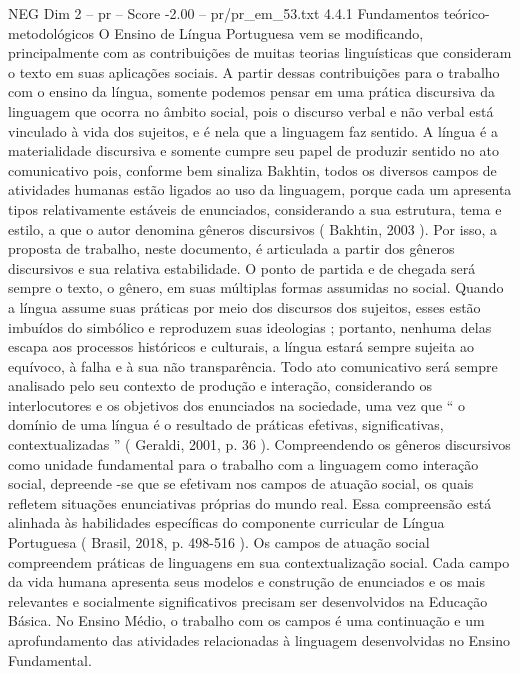 \begin{textsample}{NEG Dim 2 – pr – Score -2.00 – pr/pr\_em\_53.txt}  \label{ex:f2_neg_175}
4.4.1 Fundamentos teórico-metodológicos O Ensino de Língua Portuguesa vem se modificando, principalmente com as contribuições de muitas teorias linguísticas que consideram o texto em suas aplicações sociais.
A partir dessas contribuições para o trabalho com o ensino da língua, somente podemos pensar em uma prática discursiva da linguagem que ocorra no âmbito social, pois o discurso verbal e não verbal está vinculado à vida dos sujeitos, e é nela que a linguagem faz sentido.
A língua é a materialidade discursiva e somente cumpre seu papel de produzir sentido no ato comunicativo pois, conforme bem sinaliza Bakhtin, todos os diversos campos de atividades humanas estão ligados ao uso da linguagem, porque cada um apresenta tipos relativamente estáveis de enunciados, considerando a sua estrutura, tema e estilo, a que o autor denomina gêneros discursivos ( Bakhtin, 2003 ).
Por isso, a proposta de trabalho, neste documento, é articulada a partir dos gêneros discursivos e sua relativa estabilidade.
O ponto de partida e de chegada será sempre o texto, o gênero, em suas múltiplas formas assumidas no social.
Quando a língua assume suas práticas por meio dos discursos dos sujeitos, esses estão imbuídos do simbólico e reproduzem suas ideologias ; portanto, nenhuma delas escapa aos processos históricos e culturais, a língua estará sempre sujeita ao equívoco, à falha e à sua não transparência.
Todo ato comunicativo será sempre analisado pelo seu contexto de produção e interação, considerando os interlocutores e os objetivos dos enunciados na sociedade, uma vez que “ o domínio de uma língua é o resultado de práticas efetivas, significativas, contextualizadas ” ( Geraldi, 2001, p. 36 ).
Compreendendo os gêneros discursivos como unidade fundamental para o trabalho com a linguagem como interação social, depreende -se que se efetivam nos campos de atuação social, os quais refletem situações enunciativas próprias do mundo real.
Essa compreensão está alinhada às habilidades específicas do componente curricular de Língua Portuguesa ( Brasil, 2018, p. 498-516 ).
Os campos de atuação social compreendem práticas de linguagens em sua contextualização social.
Cada campo da vida humana apresenta seus modelos e construção de enunciados e os mais relevantes e socialmente significativos precisam ser desenvolvidos na Educação Básica.
No Ensino Médio, o trabalho com os campos é uma continuação e um aprofundamento das atividades relacionadas à linguagem desenvolvidas no Ensino Fundamental.

\end{textsample}
